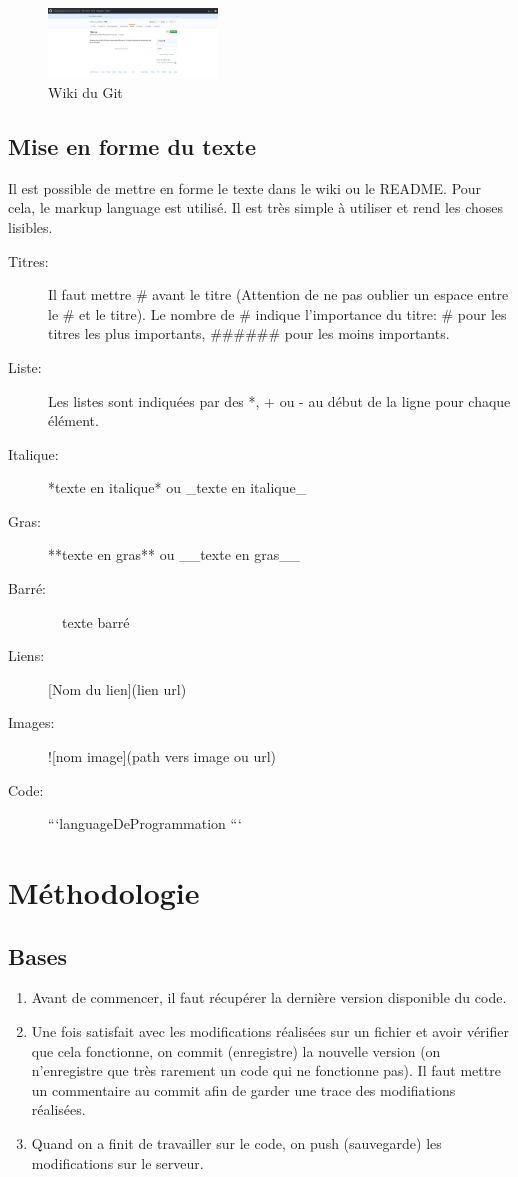 \documentclass[a4paper, 11pt]{report}
\begin{document}
\begin{figure}[h!]
\begin{centering}
\includegraphics[width=0.4\textwidth]{images/wikiGit.png}
\caption{Wiki du Git}
\par\end{centering}
\end{figure}

\subsection{Mise en forme du texte}
Il est possible de mettre en forme le texte dans le wiki ou le README. Pour cela, le markup language est utilisé. Il est très simple à utiliser et rend les choses lisibles.

\begin{description}
\item[Titres:] Il faut mettre \# avant le titre (Attention de ne pas oublier un espace entre le \# et le titre). Le nombre de \# indique l'importance du titre: \# pour les titres les plus importants, \#\#\#\#\#\# pour les moins importants.
\item[Liste:] Les listes sont indiquées par des *, + ou - au début de la ligne pour chaque élément.
\item[Italique:] *texte en italique* ou \_texte en italique\_
\item[Gras:] **texte en gras** ou \_\_texte en gras\_\_
\item[Barré:]~~texte barré~~
\item[Liens:] [Nom du lien](lien url)
\item[Images:] ![nom image](path vers image ou url)
\item[Code:] ```languageDeProgrammation   ```
\end{description}


\section{Méthodologie}

\subsection{Bases}
\begin{enumerate}
\item Avant de commencer, il faut récupérer la dernière version disponible du code.
\item Une fois satisfait avec les modifications réalisées sur un fichier et avoir vérifier que cela fonctionne, on commit (enregistre) la nouvelle version (on n'enregistre que très rarement un code qui ne fonctionne pas). Il faut mettre un commentaire au commit afin de garder une trace des modifiations réalisées.
\item Quand on a finit de travailler sur le code, on push (sauvegarde)  les modifications sur le serveur.
\end{enumerate}
\end{document}
